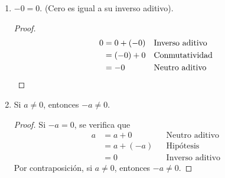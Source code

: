 \documentclass[11pt]{article}
\newcommand{\bfit}[1]{\textbf{\textit{#1}}}
\begin{document}
\begin{enumerate}[label=\alph*)]
    \bfit{Corolario:} $-(-a)=a$. (Inverso aditivo del inverso aditivo).
    \vspace{-1em}\begin{proof}
    \begin{align*}
        0 &= a + (-a) && \text{Inverso aditivo}\\
        &= (-a) + a && \text{Conmutatividad}
    \end{align*} Por la unicidad del inverso aditivo sigue que $a=-(-a)$.
    \end{proof} \vspace{-1em}
    \textbf{Nota:} En esta demostración, al emplear la \textit{forma} de la unicidad del inverso aditivo, $x+y=0 \Longrightarrow y=-x$, hemos tomado $x=(-a)$ y $y=a$.

    \item $-0 = 0$. (Cero es igual a su inverso aditivo).
    \vspace{-1em}\begin{proof}
        \begin{align*}
            0 &= 0 + (-0) && \text{Inverso aditivo}\\
            &= (-0) + 0 && \text{Conmutatividad}\\
            &= -0 && \text{Neutro aditivo} \qedhere
        \end{align*}
    \end{proof} \vspace{-1em}
%
    \item Si $a\neq 0$, entonces $-a\neq 0$.
    \vspace{-1em}
    \begin{proof} 
        Si $-a=0$, se verifica que \vspace{1em} \begin{align*}
            a &= a + 0 && \text{Neutro aditivo}\\
            &= a + (-a) && \text{Hipótesis}\\
            &= 0 && \text{Inverso aditivo}
        \end{align*} Por contraposición, si $a\neq 0$, entonces $-a\neq 0$.
    \end{proof} \vspace{-1em}


\end{enumerate}
\end{document}
